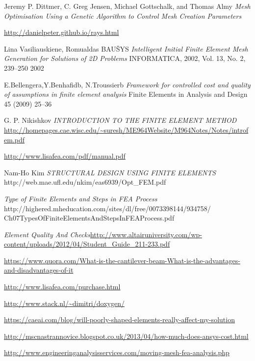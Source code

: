 \begin{changemargin}{\CMwidth}{\CMheight}
\begin{thebibliography}{9}
 Jeremy P. Dittmer, C. Greg Jensen, Michael Gottschalk, and Thomas Almy \emph{Mesh Optimisation Using a Genetic Algorithm to Control Mesh Creation Parameters}

 \url{http://danielpeter.github.io/rays.html}

 Lina Vasiliauskiene, Romualdas BAUŠYS \emph{Intelligent Initial Finite Element Mesh Generation for Solutions of 2D Problems} INFORMATICA, 2002, Vol. 13, No. 2, 239–250 2002

 E.Bellengera,Y.Benhafidb, N.Troussierb \emph{Framework for controlled cost and quality of assumptions in finite element analysis} Finite Elements in Analysis and Design 45 (2009) 25--36

 G. P. Nikishkov \emph{INTRODUCTION TO THE FINITE ELEMENT METHOD} \url{http://homepages.cae.wisc.edu/~suresh/ME964Website/M964Notes/Notes/introfem.pdf}

 \url{http://www.lisafea.com/pdf/manual.pdf}

Nam-Ho Kim \emph{STRUCTURAL DESIGN USING FINITE ELEMENTS} http://web.mae.ufl.edu/nkim/eas6939/Opt\_FEM.pdf

\emph{Type of Finite Elements and Steps in FEA Process}\\
http://highered.mheducation.com/sites/dl/free/0073398144/934758/\\Ch07TypesOfFiniteElementsAndStepsInFEAProcess.pdf 


\emph{Element Quality And Checks}\url{http://www.altairuniversity.com/wp-content/uploads/2012/04/Student_Guide_211-233.pdf}

 \url{https://www.quora.com/What-is-the-cantilever-beam-What-is-the-advantages-and-disadvantages-of-it}

 \url{http://www.lisafea.com/purchase.html}

 \url{http://www.stack.nl/~dimitri/doxygen/} 

 \url{https://caeai.com/blog/will-poorly-shaped-elements-really-affect-my-solution}

 \url{http://mscnastrannovice.blogspot.co.uk/2013/04/how-much-does-ansys-cost.html}

 \url{http://www.engineeringanalysisservices.com/moving-mesh-fea-analysis.php}


\end{thebibliography}
\end{changemargin}
